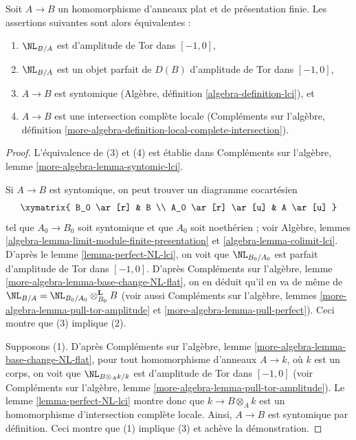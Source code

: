\begin{lemma}
\label{lemma-flat-fp-NL-lci}
Soit $A \to B$ un homomorphisme d'anneaux plat et de présentation finie.
Les assertions suivantes sont alors équivalentes :
\begin{enumerate}
\item $\NL_{B/A}$ est d'amplitude de Tor dans $[-1, 0]$,
\item $\NL_{B/A}$ est un objet parfait de $D(B)$
d'amplitude de Tor dans $[-1, 0]$,
\item $A \to B$ est
syntomique (Algèbre, définition \ref{algebra-definition-lci}), et
\item $A \to B$ est une intersection complète locale
(Compléments sur l'algèbre, définition
\ref{more-algebra-definition-local-complete-intersection}).
\end{enumerate}
\end{lemma}

\begin{proof}
L'équivalence de (3) et (4) est établie dans Compléments sur l'algèbre, lemme
\ref{more-algebra-lemma-syntomic-lci}.

\medskip\noindent
Si $A \to B$ est syntomique, on peut trouver un diagramme cocartésien
$$
\xymatrix{
B_0 \ar[r] & B \\
A_0 \ar[r] \ar[u] & A \ar[u]
}
$$
tel que $A_0 \to B_0$ soit syntomique et que $A_0$ soit noethérien ;
voir Algèbre, lemmes \ref{algebra-lemma-limit-module-finite-presentation} et
\ref{algebra-lemma-colimit-lci}. D'après le lemme \ref{lemma-perfect-NL-lci},
on voit que $\NL_{B_0/A_0}$ est parfait d'amplitude de Tor dans $[-1, 0]$.
D'après Compléments sur l'algèbre, lemme \ref{more-algebra-lemma-base-change-NL-flat},
on en déduit qu'il en va de même de
$\NL_{B/A} = \NL_{B_0/A_0} \otimes_{B_0}^\mathbf{L} B$ (voir
aussi Compléments sur l'algèbre, lemmes \ref{more-algebra-lemma-pull-tor-amplitude} et
\ref{more-algebra-lemma-pull-perfect}).
Ceci montre que (3) implique (2).

\medskip\noindent
Supposons (1). D'après Compléments sur l'algèbre, lemme
\ref{more-algebra-lemma-base-change-NL-flat}, pour tout
homomorphisme d'anneaux $A \to k$, où
$k$ est un corps, on voit que $\NL_{B \otimes_A k/k}$ est
d'amplitude de Tor dans $[-1, 0]$ (voir
Compléments sur l'algèbre, lemme \ref{more-algebra-lemma-pull-tor-amplitude}).
Le lemme \ref{lemma-perfect-NL-lci} montre donc que $k \to B \otimes_A k$ est
un homomorphisme d'intersection complète locale. Ainsi, $A \to B$
est syntomique par définition. Ceci montre que (1) implique (3)
et achève la démonstration.
\end{proof}





